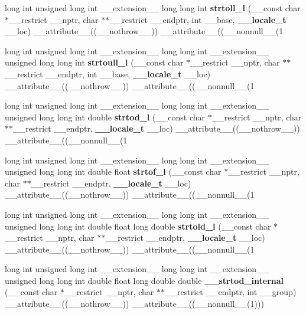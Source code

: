 \begin{DoxyCompactItemize}
\item 
long int unsigned long int \_\-\_\-extension\_\-\_\- long long int {\bf strtoll\_\-l} (\_\-\_\-const char $\ast$\_\-\_\-restrict \_\-\_\-nptr, char $\ast$$\ast$\_\-\_\-restrict \_\-\_\-endptr, int \_\-\_\-base, {\bf \_\-\_\-locale\_\-t} \_\-\_\-loc) \_\-\_\-attribute\_\-\_\-((\_\-\_\-nothrow\_\-\_\-)) \_\-\_\-attribute\_\-\_\-((\_\-\_\-nonnull\_\-\_\-(1
\item 
long int unsigned long int \_\-\_\-extension\_\-\_\- long long int \_\-\_\-extension\_\-\_\- unsigned long long int {\bf strtoull\_\-l} (\_\-\_\-const char $\ast$\_\-\_\-restrict \_\-\_\-nptr, char $\ast$$\ast$\_\-\_\-restrict \_\-\_\-endptr, int \_\-\_\-base, {\bf \_\-\_\-locale\_\-t} \_\-\_\-loc) \_\-\_\-attribute\_\-\_\-((\_\-\_\-nothrow\_\-\_\-)) \_\-\_\-attribute\_\-\_\-((\_\-\_\-nonnull\_\-\_\-(1
\item 
long int unsigned long int \_\-\_\-extension\_\-\_\- long long int \_\-\_\-extension\_\-\_\- unsigned long long int double {\bf strtod\_\-l} (\_\-\_\-const char $\ast$\_\-\_\-restrict \_\-\_\-nptr, char $\ast$$\ast$\_\-\_\-restrict \_\-\_\-endptr, {\bf \_\-\_\-locale\_\-t} \_\-\_\-loc) \_\-\_\-attribute\_\-\_\-((\_\-\_\-nothrow\_\-\_\-)) \_\-\_\-attribute\_\-\_\-((\_\-\_\-nonnull\_\-\_\-(1
\item 
long int unsigned long int \_\-\_\-extension\_\-\_\- long long int \_\-\_\-extension\_\-\_\- unsigned long long int double float {\bf strtof\_\-l} (\_\-\_\-const char $\ast$\_\-\_\-restrict \_\-\_\-nptr, char $\ast$$\ast$\_\-\_\-restrict \_\-\_\-endptr, {\bf \_\-\_\-locale\_\-t} \_\-\_\-loc) \_\-\_\-attribute\_\-\_\-((\_\-\_\-nothrow\_\-\_\-)) \_\-\_\-attribute\_\-\_\-((\_\-\_\-nonnull\_\-\_\-(1
\item 
long int unsigned long int \_\-\_\-extension\_\-\_\- long long int \_\-\_\-extension\_\-\_\- unsigned long long int double float long double {\bf strtold\_\-l} (\_\-\_\-const char $\ast$\_\-\_\-restrict \_\-\_\-nptr, char $\ast$$\ast$\_\-\_\-restrict \_\-\_\-endptr, {\bf \_\-\_\-locale\_\-t} \_\-\_\-loc) \_\-\_\-attribute\_\-\_\-((\_\-\_\-nothrow\_\-\_\-)) \_\-\_\-attribute\_\-\_\-((\_\-\_\-nonnull\_\-\_\-(1
\item 
long int unsigned long int \_\-\_\-extension\_\-\_\- long long int \_\-\_\-extension\_\-\_\- unsigned long long int double float long double double {\bf \_\-\_\-strtod\_\-internal} (\_\-\_\-const char $\ast$\_\-\_\-restrict \_\-\_\-nptr, char $\ast$$\ast$\_\-\_\-restrict \_\-\_\-endptr, int \_\-\_\-group) \_\-\_\-attribute\_\-\_\-((\_\-\_\-nothrow\_\-\_\-)) \_\-\_\-attribute\_\-\_\-((\_\-\_\-nonnull\_\-\_\-(1)))

\end{DoxyCompactItemize}
